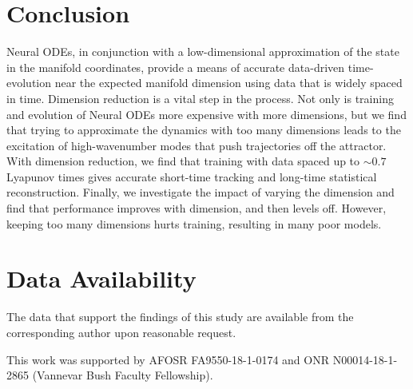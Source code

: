 \documentclass[preprint,aps,pre,letterpaper,onecolumn,superscriptaddress]{revtex4-2} %
\begin{document}
\section{Conclusion} \label{sec:Conclusion}

Neural ODEs, in conjunction with a low-dimensional approximation of the state in the manifold coordinates, provide a means of accurate data-driven time-evolution near the expected manifold dimension using data that is widely spaced in time. Dimension reduction is a vital step in the process. Not only is training and evolution of Neural ODEs more expensive with more dimensions, but we find that trying to approximate the dynamics with too many dimensions leads to the excitation of high-wavenumber modes that push trajectories off the attractor. With dimension reduction, we find that training with data spaced up to $\sim0.7$ Lyapunov times gives accurate short-time tracking and long-time statistical reconstruction. Finally, we investigate the impact of varying the dimension and find that performance improves with dimension, and then levels off. However, keeping too many dimensions hurts training, resulting in many poor models.


\section*{Data Availability}
The data that support the findings of this study are available from the corresponding author upon reasonable request.

\begin{acknowledgments}
This work was supported by AFOSR  FA9550-18-1-0174 and ONR N00014-18-1-2865 (Vannevar Bush Faculty Fellowship).
\end{acknowledgments}



\end{document}
